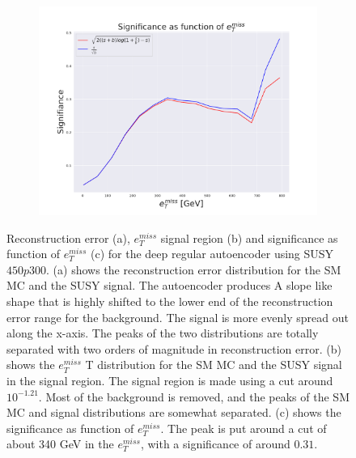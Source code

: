 \begin{figure}[H]
    \hfill  
    \begin{subfigure}{.40\textwidth}
        \includegraphics[width=\textwidth]{Figures/AE_testing/small/2lep/significance_etmiss_800p0p050_-1.2087791708604207.pdf}
        \caption{}
        \label{fig:AE_2lep_small_signi_800_2}
    \end{subfigure}
    \hfill      
    \caption[2lep shallow network | $800p50$ | AE | 2]{Reconstruction error (a), $e_T^{miss}$ signal region (b) and significance as function of 
    $e_T^{miss}$ (c) for the deep regular autoencoder using SUSY $450p300$. 
    (a) shows the reconstruction error distribution for the SM MC and the SUSY signal. 
    The autoencoder produces A slope like shape that is highly shifted to the lower end of the reconstruction error range
for the background. The signal is more evenly spread out along the x-axis. The peaks of the two distributions are totally separated
with two orders of magnitude in reconstruction error. (b) shows the $e_T^{miss}$
T distribution for the SM MC and the SUSY signal in the signal region. The signal region is made using a cut around
$10^{-1.21}$. Most of the background is removed, and the peaks of the SM MC and signal distributions are
somewhat separated. (c) shows the significance as function of $e_T^{miss}$. The peak is put 
around a cut of about 340 GeV in the $e_T^{miss}$, with a significance of around $0.31$.}
    \label{fig:AE_2lep_small_rec_sig_signi_800_2}
\end{figure}
























